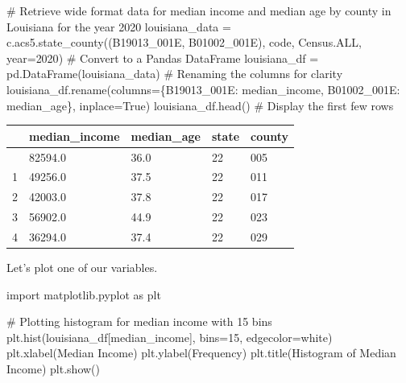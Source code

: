 \documentclass[
  letterpaper,
  DIV=11,
  numbers=noendperiod]{scrreprt}
\newenvironment{Shaded}{\begin{snugshade}}{\end{snugshade}}
\newcommand{\CommentTok}[1]{\textcolor[rgb]{0.37,0.37,0.37}{#1}}
\newcommand{\DecValTok}[1]{\textcolor[rgb]{0.68,0.00,0.00}{#1}}
\newcommand{\ImportTok}[1]{\textcolor[rgb]{0.00,0.46,0.62}{#1}}
\newcommand{\NormalTok}[1]{\textcolor[rgb]{0.00,0.23,0.31}{#1}}
\newcommand{\OperatorTok}[1]{\textcolor[rgb]{0.37,0.37,0.37}{#1}}
\newcommand{\StringTok}[1]{\textcolor[rgb]{0.13,0.47,0.30}{#1}}
\newcommand{\VariableTok}[1]{\textcolor[rgb]{0.07,0.07,0.07}{#1}}
\begin{document}
\begin{Shaded}
\begin{Highlighting}[]
\CommentTok{\# Retrieve wide format data for median income and median age by county in Louisiana for the year 2020}
\NormalTok{louisiana\_data }\OperatorTok{=}\NormalTok{ c.acs5.state\_county((}\StringTok{\textquotesingle{}B19013\_001E\textquotesingle{}}\NormalTok{, }\StringTok{\textquotesingle{}B01002\_001E\textquotesingle{}}\NormalTok{), code, Census.ALL, year}\OperatorTok{=}\DecValTok{2020}\NormalTok{)}
\CommentTok{\# Convert to a Pandas DataFrame}
\NormalTok{louisiana\_df }\OperatorTok{=}\NormalTok{ pd.DataFrame(louisiana\_data)}
\CommentTok{\# Renaming the columns for clarity}
\NormalTok{louisiana\_df.rename(columns}\OperatorTok{=}\NormalTok{\{}\StringTok{\textquotesingle{}B19013\_001E\textquotesingle{}}\NormalTok{: }\StringTok{\textquotesingle{}median\_income\textquotesingle{}}\NormalTok{, }\StringTok{\textquotesingle{}B01002\_001E\textquotesingle{}}\NormalTok{: }\StringTok{\textquotesingle{}median\_age\textquotesingle{}}\NormalTok{\}, inplace}\OperatorTok{=}\VariableTok{True}\NormalTok{)}
\NormalTok{louisiana\_df.head()  }\CommentTok{\# Display the first few rows}
\end{Highlighting}
\end{Shaded}

\begin{longtable}[]{@{}lllll@{}}
\toprule\noalign{}
& median\_income & median\_age & state & county \\
\midrule\noalign{}
\endhead
\bottomrule\noalign{}
\endlastfoot
0 & 82594.0 & 36.0 & 22 & 005 \\
1 & 49256.0 & 37.5 & 22 & 011 \\
2 & 42003.0 & 37.8 & 22 & 017 \\
3 & 56902.0 & 44.9 & 22 & 023 \\
4 & 36294.0 & 37.4 & 22 & 029 \\
\end{longtable}

Let's plot one of our variables.

\begin{Shaded}
\begin{Highlighting}[]
\ImportTok{import}\NormalTok{ matplotlib.pyplot }\ImportTok{as}\NormalTok{ plt}

\CommentTok{\# Plotting histogram for median income with 15 bins}
\NormalTok{plt.hist(louisiana\_df[}\StringTok{\textquotesingle{}median\_income\textquotesingle{}}\NormalTok{], bins}\OperatorTok{=}\DecValTok{15}\NormalTok{, edgecolor}\OperatorTok{=}\StringTok{\textquotesingle{}white\textquotesingle{}}\NormalTok{)}
\NormalTok{plt.xlabel(}\StringTok{\textquotesingle{}Median Income\textquotesingle{}}\NormalTok{)}
\NormalTok{plt.ylabel(}\StringTok{\textquotesingle{}Frequency\textquotesingle{}}\NormalTok{)}
\NormalTok{plt.title(}\StringTok{\textquotesingle{}Histogram of Median Income\textquotesingle{}}\NormalTok{)}
\NormalTok{plt.show()}
\end{Highlighting}
\end{Shaded}
\end{document}
